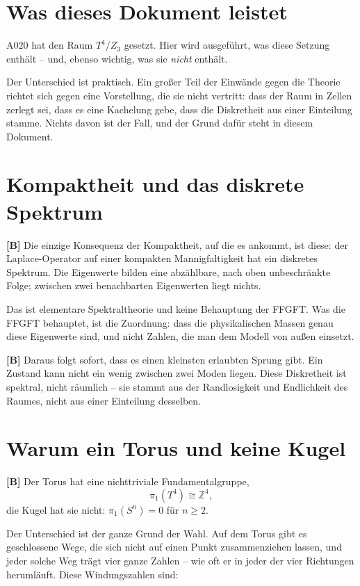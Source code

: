 \section{Was dieses Dokument leistet}

A020 hat den Raum $T^4/Z_3$ gesetzt. Hier wird ausgeführt, was diese Setzung
enthält -- und, ebenso wichtig, was sie \emph{nicht} enthält.

Der Unterschied ist praktisch. Ein großer Teil der Einwände gegen die Theorie
richtet sich gegen eine Vorstellung, die sie nicht vertritt: dass der Raum in
Zellen zerlegt sei, dass es eine Kachelung gebe, dass die Diskretheit aus einer
Einteilung stamme. Nichts davon ist der Fall, und der Grund dafür steht in
diesem Dokument.

\section{Kompaktheit und das diskrete Spektrum}

\textbf{[B]} Die einzige Konsequenz der Kompaktheit, auf die es ankommt, ist
diese: der Laplace-Operator auf einer kompakten Mannigfaltigkeit hat ein
diskretes Spektrum. Die Eigenwerte bilden eine abzählbare, nach oben
unbeschränkte Folge; zwischen zwei benachbarten Eigenwerten liegt nichts.

Das ist elementare Spektraltheorie und keine Behauptung der FFGFT. Was die
FFGFT behauptet, ist die Zuordnung: dass die physikalischen Massen genau diese
Eigenwerte sind, und nicht Zahlen, die man dem Modell von außen einsetzt.

\textbf{[B]} Daraus folgt sofort, dass es einen kleinsten erlaubten Sprung
gibt. Ein Zustand kann nicht ein wenig zwischen zwei Moden liegen. Diese
Diskretheit ist spektral, nicht räumlich -- sie stammt aus der Randlosigkeit
und Endlichkeit des Raumes, nicht aus einer Einteilung desselben.

\section{Warum ein Torus und keine Kugel}

\textbf{[B]} Der Torus hat eine nichttriviale Fundamentalgruppe,
\[
  \pi_1(T^4) \cong \mathbb{Z}^4 ,
\]
die Kugel hat sie nicht: $\pi_1(S^n) = 0$ für $n\geq 2$.

Der Unterschied ist der ganze Grund der Wahl. Auf dem Torus gibt es geschlossene
Wege, die sich nicht auf einen Punkt zusammenziehen lassen, und jeder solche Weg
trägt vier ganze Zahlen -- wie oft er in jeder der vier Richtungen herumläuft.
Diese Windungszahlen sind:

